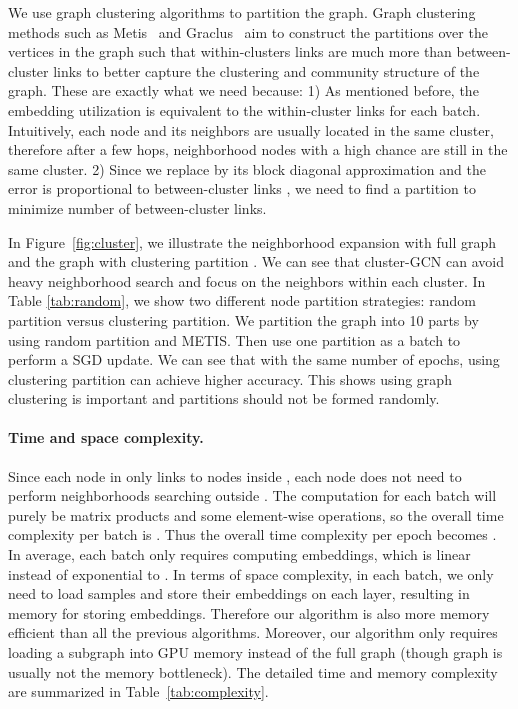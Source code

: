 \documentclass[sigconf]{acmart}
\begin{document}
We use graph clustering algorithms to partition the graph. 
Graph clustering methods such as Metis~\cite{Metis} and Graclus~\cite{Graclus} aim to construct the partitions over the vertices in the graph such that within-clusters links are much more than between-cluster links to better capture the clustering and community structure of the graph. These are exactly what we need because: 
1) As mentioned before, the embedding utilization is equivalent to the within-cluster links for each batch. Intuitively, each node and its neighbors are usually located in the same cluster, therefore after a few hops, neighborhood nodes with a high chance are still in the same cluster. 
2) Since we replace  by its block diagonal approximation  and the error is proportional to between-cluster links , we need to find a partition to minimize number of  between-cluster links. 


 In Figure~\ref{fig:cluster}, we illustrate the neighborhood expansion with full graph  and the graph with clustering partition . 
 We can see that cluster-GCN can avoid heavy neighborhood search and focus on the neighbors within each cluster. 
In Table \ref{tab:random}, we show two different node partition strategies:  random partition versus clustering partition.
 We partition the graph into 10 parts by using random partition and METIS.
 Then use one partition as a batch to perform a SGD update. 
We can see that with the same number of epochs, using clustering partition can achieve higher accuracy. This shows using graph clustering is important and partitions should not be formed randomly. 
 
\paragraph{\bf Time and space complexity. }
Since each node in  only links to nodes inside , each node does not need to perform neighborhoods searching outside . The computation for each batch will purely be matrix products  and some element-wise operations, so the overall time complexity per batch is .
Thus the overall time complexity per epoch becomes . 
In average, each batch only requires computing  embeddings, which is linear instead of exponential to . 
In terms of space complexity, in each batch, we only need to load  samples and store their embeddings on each layer, resulting in  memory for storing embeddings.
Therefore our algorithm is also more memory efficient than all the previous algorithms. 
Moreover, our algorithm only requires loading a subgraph into GPU memory instead of the full graph (though graph is usually not the memory bottleneck). 
The detailed time and memory complexity are summarized in Table~\ref{tab:complexity}. 
\end{document}
